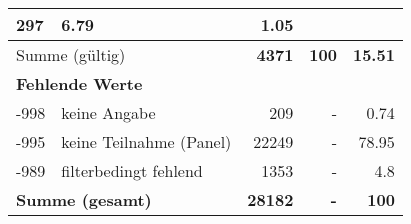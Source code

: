\begin{longtable}{lXrrr}
       \num{297} &
       \num[round-mode=places,round-precision=2]{6,79} &
         \num[round-mode=places,round-precision=2]{1,05} \\
     \midrule
     \multicolumn{2}{l}{Summe (gültig)} &
       \textbf{\num{4371}} &
     \textbf{100} &
       \textbf{\num[round-mode=places,round-precision=2]{15,51}} \\
     \multicolumn{5}{l}{\textbf{Fehlende Werte}}\\
       -998 &
       keine Angabe &
         \num{209} &
        - &
         \num[round-mode=places,round-precision=2]{0,74} \\
       -995 &
       keine Teilnahme (Panel) &
         \num{22249} &
        - &
         \num[round-mode=places,round-precision=2]{78,95} \\
       -989 &
       filterbedingt fehlend &
         \num{1353} &
        - &
         \num[round-mode=places,round-precision=2]{4,8} \\
     \midrule
     \multicolumn{2}{l}{\textbf{Summe (gesamt)}} &
          \textbf{\num{28182}} &
        \textbf{-} &
        \textbf{100} \\
     \bottomrule
     \end{longtable}
     
